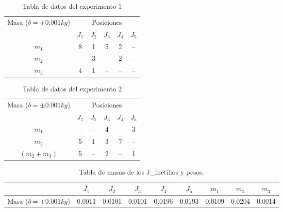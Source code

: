 \documentclass[../main.tex]{subfiles}
\begin{document}
\begin{table}[H]
    \centering
    \begin{tabular}{c|c|c|c|c|c}
        \hline
        \multirow{2}{*}{Masa ($\delta = \pm 0.001kg$)}     
         & \multicolumn{5}{c}{Posiciones}\\
        \cline{2-6}
              &  $J_1$  &  $J_2$  &  $J_3$  &  $J_4$  &  $J_5$ \\  
        \hline
        $m_1$ &  8   &  1   &  5   &  2   &  -- \\   
        $m_2$ &  --  &  3   &  --  &  2   &  -- \\ 
        $m_3$ &  4   &  1   &  --  &  --  &  -- \\ 
        \hline
    \end{tabular}
    \label{ref:table1}
    \caption{Tabla de datos del experimento 1}
\end{table}

\begin{table}[H]
    \centering
    \begin{tabular}{c|c|c|c|c|c}
        \hline
        \multirow{2}{*}{Masa ($\delta = \pm 0.001kg$)}     
         & \multicolumn{5}{c}{Posiciones}\\
        \cline{2-6}
             &  $J_1$  &  $J_2$  &  $J_3$  &  $J_4$  &  $J_5$ \\  
        \hline
        $m_1$ &  --  &  --   &  4  &  --  &  3 \\ 
        $m_2$ &  5   &  1    &  3  &  7   &  -- \\   
        $(m_2 + m_3)$  &  5   &  --  &  2  &  --  &  1 \\ 
        \hline
    \end{tabular}
    \label{ref:table2}
    \caption{Tabla de datos del experimento 2}
\end{table}

\begin{table}[H]
    \centering
    \begin{tabular}{c|c|c|c|c|c|c|c|c}
    \cline{2-9}
                                  &  $J_1$   &  $J_2$    &  $J_3$    &  $J_4$   &  $J_5$  & $m_1 $  & $m_2 $  & $m_3$\\ 
    \hline
    Masa ($\delta = \pm 0.001kg$) &  0.0011  &  0.0101  &  0.0101  &  0.0196 & 0.0193 & 0.0109 & 0.0204 & 0.0014 \\
    \hline 
    \end{tabular}
    \label{ref:table3}
    \caption{Tabla de masas de los J_inetillos y pesos.}
\end{table}
\end{document}
